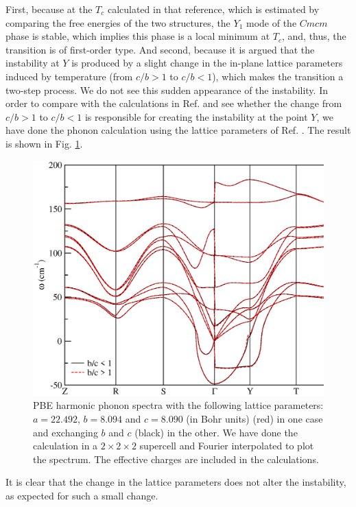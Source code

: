 First, because at the $T_{c}$ calculated in that reference, which is estimated by comparing the free energies of the 
two structures, the $Y_{1}$ mode of the $Cmcm$ phase is stable, which implies this phase is a local minimum 
at $T_{c}$, and, thus, the transition is of first-order type. And second, because it is argued that the instability 
at $Y$ is produced by a slight change in the in-plane lattice parameters induced by temperature (from $c/b>1$ to 
$c/b<1$), which makes the transition a two-step process. We do not see this sudden appearance of the instability. 
In order to compare with the calculations in Ref. \cite{dewandre2016two} and see whether the change from $c/b>1$ to
$c/b<1$ is responsible for creating the instability at the point $Y$, we have done the phonon calculation using the
lattice parameters of Ref. \cite{dewandre2016two}. The result is shown in Fig. \ref{exchangebc}.
\begin{figure}[th]
\begin{center}
\includegraphics[width=0.9\linewidth]{Figures/exchangebc-harmonic.eps}
\caption[Harmonic phonons of $Cmcm$ SnSe exchanging the $b$ and $c$ lattice parameters.]{PBE harmonic phonon spectra with the following lattice parameters: $a=22.492$, $b=8.094$ and $c=8.090$ (in
Bohr units) (red) in one case and exchanging $b$ and $c$ (black) in the other. We have done the calculation in a
$2\times2\times2$ supercell and Fourier interpolated to plot the spectrum. The effective charges are included in the
calculations.}
\label{exchangebc}
\end{center}
\end{figure}
It is clear that the change in the lattice parameters does not alter the instability, as expected for such a small
change. \\

